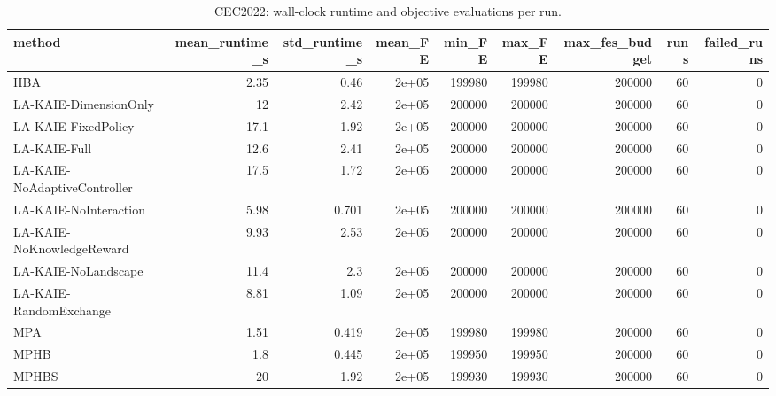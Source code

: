 \begin{table}[t]
\centering
\scriptsize
\caption{CEC2022: wall-clock runtime and objective evaluations per run.}
\label{tab:cec2022_runtime}
\begin{tabular}{lrrrrrrrr}
\toprule
method & mean\_runtime\_s & std\_runtime\_s & mean\_FE & min\_FE & max\_FE & max\_fes\_budget & runs & failed\_runs \\
\midrule
HBA & 2.35 & 0.46 & 2e+05 & 199980 & 199980 & 200000 & 60 & 0 \\
LA-KAIE-DimensionOnly & 12 & 2.42 & 2e+05 & 200000 & 200000 & 200000 & 60 & 0 \\
LA-KAIE-FixedPolicy & 17.1 & 1.92 & 2e+05 & 200000 & 200000 & 200000 & 60 & 0 \\
LA-KAIE-Full & 12.6 & 2.41 & 2e+05 & 200000 & 200000 & 200000 & 60 & 0 \\
LA-KAIE-NoAdaptiveController & 17.5 & 1.72 & 2e+05 & 200000 & 200000 & 200000 & 60 & 0 \\
LA-KAIE-NoInteraction & 5.98 & 0.701 & 2e+05 & 200000 & 200000 & 200000 & 60 & 0 \\
LA-KAIE-NoKnowledgeReward & 9.93 & 2.53 & 2e+05 & 200000 & 200000 & 200000 & 60 & 0 \\
LA-KAIE-NoLandscape & 11.4 & 2.3 & 2e+05 & 200000 & 200000 & 200000 & 60 & 0 \\
LA-KAIE-RandomExchange & 8.81 & 1.09 & 2e+05 & 200000 & 200000 & 200000 & 60 & 0 \\
MPA & 1.51 & 0.419 & 2e+05 & 199980 & 199980 & 200000 & 60 & 0 \\
MPHB & 1.8 & 0.445 & 2e+05 & 199950 & 199950 & 200000 & 60 & 0 \\
MPHBS & 20 & 1.92 & 2e+05 & 199930 & 199930 & 200000 & 60 & 0 \\
\bottomrule
\end{tabular}
\end{table}
